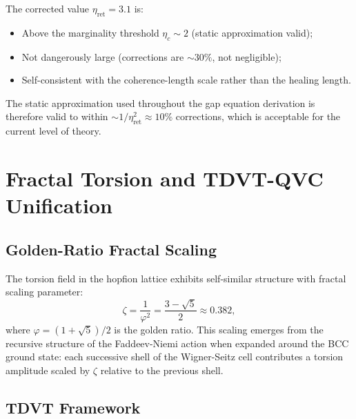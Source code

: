 \documentclass[11pt,letterpaper]{article}
\begin{document}
The corrected value $\eta_{\text{ret}} = 3.1$ is:
\begin{itemize}[nosep]
    \item Above the marginality threshold $\eta_c \sim 2$ (static approximation valid);
    \item Not dangerously large (corrections are $\sim 30\%$, not negligible);
    \item Self-consistent with the coherence-length scale rather than the healing length.
\end{itemize}

The static approximation used throughout the gap equation derivation is therefore valid to within $\sim 1/\eta_{\text{ret}}^2 \approx 10\%$ corrections, which is acceptable for the current level of theory.

\section{Fractal Torsion and TDVT-QVC Unification}
\label{sec:fractal}

\subsection{Golden-Ratio Fractal Scaling}

The torsion field in the hopfion lattice exhibits self-similar structure with fractal scaling parameter:
\begin{equation}
\zeta = \frac{1}{\varphi^2} = \frac{3 - \sqrt{5}}{2} \approx 0.382,
\end{equation}
where $\varphi = (1+\sqrt{5})/2$ is the golden ratio. This scaling emerges from the recursive structure of the Faddeev-Niemi action when expanded around the BCC ground state: each successive shell of the Wigner-Seitz cell contributes a torsion amplitude scaled by $\zeta$ relative to the previous shell.

\subsection{TDVT Framework}
\end{document}
